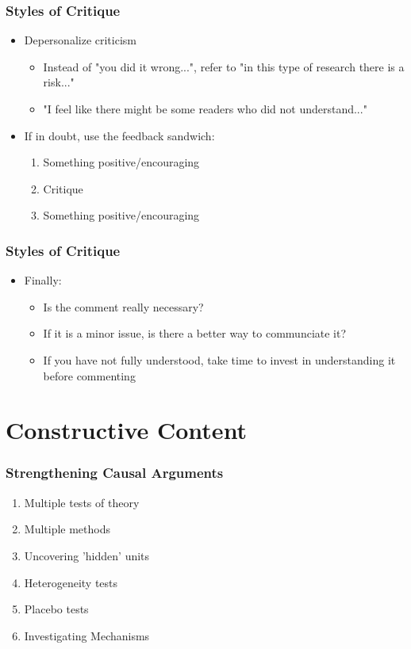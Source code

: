 \documentclass[xcolor=x11names,compress]{beamer}\usepackage[]{graphicx}\usepackage[]{xcolor}
\renewcommand{\(}{\begin{columns}}
\renewcommand{\)}{\end{columns}}
\newcommand{\<}[1]{\begin{column}{#1}}
\renewcommand{\>}{\end{column}}
\begin{document}
\begin{frame}
\frametitle{Styles of Critique}
\begin{itemize}
\item Depersonalize criticism
\pause
\begin{itemize}
\item Instead of "you did it wrong...", refer to "in this type of research there is a risk..."
\pause
\item "I feel like there might be some readers who did not understand..."
\pause
\end{itemize}
\item If in doubt, use the feedback sandwich:
\pause
\begin{enumerate}
\item Something positive/encouraging
\item Critique
\item Something positive/encouraging
\end{enumerate}
\end{itemize}
\end{frame}

\begin{frame}
\frametitle{Styles of Critique}
\begin{itemize}
\item Finally:
\pause
\begin{itemize}
\item Is the comment really necessary?
\pause
\item If it is a minor issue, is there a better way to communciate it?
\pause
\item If you have not fully understood, take time to invest in understanding it before commenting
\end{itemize}
\end{itemize}
\end{frame}

\section{Constructive Content}

\begin{frame}
\frametitle{Strengthening Causal Arguments}
\begin{enumerate}
\item Multiple tests of theory
\pause
\item Multiple methods
\pause
\item Uncovering 'hidden' units
\pause
\item Heterogeneity tests
\pause
\item Placebo tests
\pause
\item Investigating Mechanisms
\end{enumerate}
\end{frame}
\end{document}
